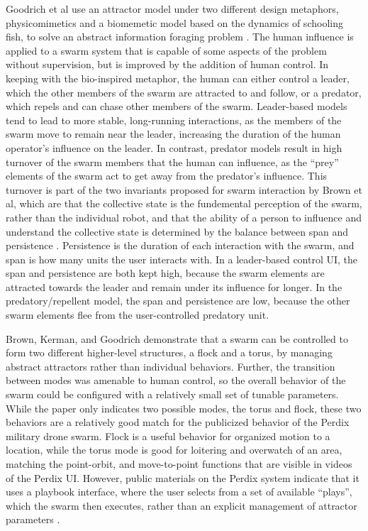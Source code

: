 Goodrich et al use an attractor model under two different design metaphors, physicomimetics and a biomemetic model based on the dynamics of schooling fish, to solve an abstract information foraging problem \citep{goodrich2011toward}. 
The human influence is applied to a swarm system that is capable of some aspects of the problem without supervision, but is improved by the addition of human control. 
In keeping with the bio-inspired metaphor, the human can either control a leader, which the other members of the swarm are attracted to and follow, or a predator, which repels and can chase other members of the swarm. 
Leader-based models tend to lead to more stable, long-running interactions, as the members of the swarm move to remain near the leader, increasing the duration of the human operator's influence on the leader. 
In contrast, predator models result in high turnover of the swarm members that the human can influence, as the ``prey'' elements of the swarm act to get away from the predator's influence. 
This turnover is part of the two invariants proposed for swarm interaction by Brown et al, which are that the collective state is the fundemental perception of the swarm, rather than the individual robot, and that the ability of a person to influence and understand the collective state is determined by the balance between span and persistence \citep{brown2015two}. 
Persistence is the duration of each interaction with the swarm, and span is how many units the user interacts with. 
In a leader-based control UI, the span and persistence are both kept high, because the swarm elements are attracted towards the leader and remain under its influence for longer. 
In the predatory/repellent model, the span and persistence are low, because the other swarm elements flee from the user-controlled predatory unit. 

Brown, Kerman, and Goodrich demonstrate that a swarm can be controlled to form two different higher-level structures, a flock and a torus, by managing abstract attractors rather than individual behaviors. 
Further, the transition between modes was amenable to human control, so the overall behavior of the swarm could be configured with a relatively small set of tunable parameters. 
While the paper only indicates two possible modes, the torus and flock, these two behaviors are a relatively good match for the publicized behavior of the Perdix military drone swarm. 
Flock is a useful behavior for organized motion to a location, while the torus mode is good for loitering and overwatch of an area, matching the point-orbit, and move-to-point functions that are visible in videos of the Perdix UI. 
However, public materials on the Perdix system indicate that it uses a playbook interface, where the user selects from a set of available ``plays'', which the swarm then executes, rather than an explicit management of attractor parameters \citep{PerdixFactsheet}. 

